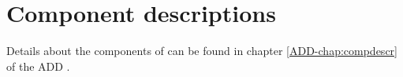\chapter{Component descriptions}
\label{chap:componentDesc}

Details about the components of \projectname{} can be found in chapter \ref*{ADD-chap:compdescr} of the ADD \cite{add}.